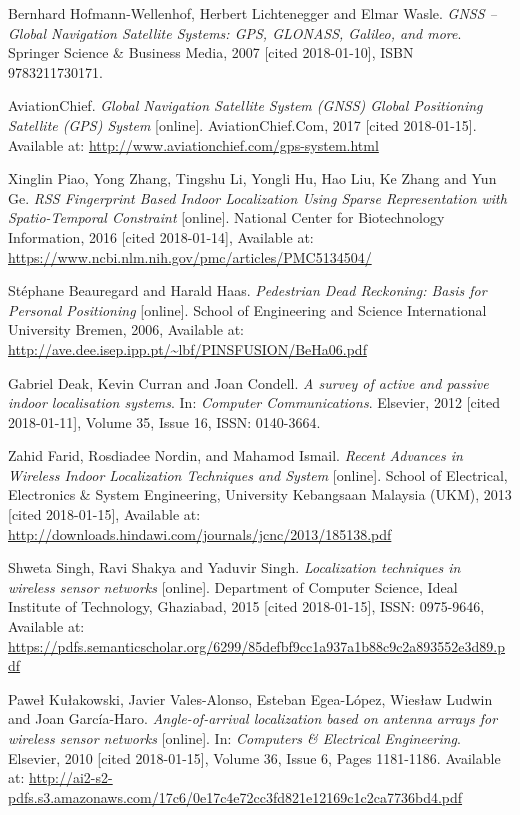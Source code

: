 \begin{thebibliography}{10}

Bernhard Hofmann-Wellenhof, Herbert Lichtenegger and Elmar Wasle. \textit{GNSS – Global Navigation Satellite Systems: GPS, GLONASS, Galileo, and more}. Springer Science \& Business Media, 2007 [cited 2018-01-10], ISBN 9783211730171.

AviationChief. \textit{Global Navigation Satellite System (GNSS) Global Positioning Satellite (GPS) System} [online]. AviationChief.Com, 2017 [cited 2018-01-15]. Available at: \url{http://www.aviationchief.com/gps-system.html}

Xinglin Piao, Yong Zhang, Tingshu Li, Yongli Hu, Hao Liu, Ke Zhang and Yun Ge. \textit{RSS Fingerprint Based Indoor Localization Using Sparse Representation with Spatio-Temporal Constraint} [online]. National Center for Biotechnology Information, 2016 [cited 2018-01-14], Available at: \url{https://www.ncbi.nlm.nih.gov/pmc/articles/PMC5134504/}

Stéphane Beauregard and Harald Haas. \textit{Pedestrian Dead Reckoning: Basis for Personal Positioning} [online]. School of Engineering and Science
International University Bremen, 2006, Available at: \url{http://ave.dee.isep.ipp.pt/~lbf/PINSFUSION/BeHa06.pdf}

Gabriel Deak, Kevin Curran and Joan Condell. \textit{A survey of active and passive indoor localisation systems}. In: \textit{Computer Communications}. Elsevier, 2012 [cited 2018-01-11], Volume 35, Issue 16, ISSN: 0140-3664.

Zahid Farid, Rosdiadee Nordin, and Mahamod Ismail. \textit{Recent Advances in Wireless Indoor Localization Techniques and System} [online]. School of Electrical, Electronics \& System Engineering, University Kebangsaan Malaysia (UKM), 2013 [cited 2018-01-15], Available at: \url{http://downloads.hindawi.com/journals/jcnc/2013/185138.pdf}

Shweta Singh, Ravi Shakya and Yaduvir Singh. \textit{Localization techniques in wireless sensor networks} [online]. Department of Computer Science,
Ideal Institute of Technology, Ghaziabad, 2015 [cited 2018-01-15], ISSN: 0975-9646, Available at: \url{https://pdfs.semanticscholar.org/6299/85defbf9cc1a937a1b88c9c2a893552e3d89.pdf}

Paweł Kułakowski, Javier Vales-Alonso, Esteban Egea-López, Wiesław Ludwin and Joan García-Haro. \textit{Angle-of-arrival localization based on antenna arrays for wireless sensor networks} [online]. In: \textit{Computers \& Electrical Engineering}. Elsevier, 2010 [cited 2018-01-15], Volume 36, Issue 6, Pages 1181-1186. Available at: \url{http://ai2-s2-pdfs.s3.amazonaws.com/17c6/0e17c4e72cc3fd821e12169c1c2ca7736bd4.pdf}


\end{thebibliography}
